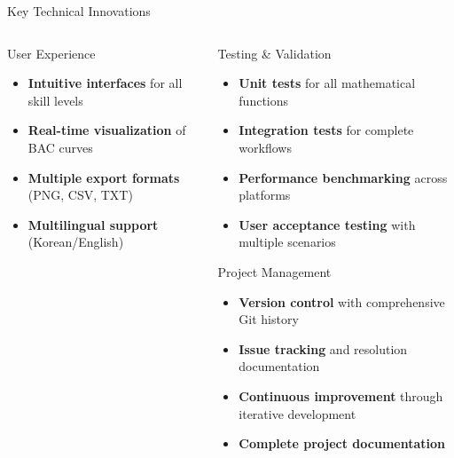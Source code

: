 \documentclass[aspectratio=169]{beamer}
\newcommand{\highlight}[1]{\textcolor{kentech_orange}{\textbf{#1}}}
\begin{document}
\begin{frame}{Key Technical Innovations}
\begin{columns}
\begin{column}{0.5\textwidth}
            \begin{block}{User Experience}
                \begin{itemize}
                    \item \highlight{Intuitive interfaces} for all skill levels
                    \item \highlight{Real-time visualization} of BAC curves
                    \item \highlight{Multiple export formats} (PNG, CSV, TXT)
                    \item \highlight{Multilingual support} (Korean/English)
                \end{itemize}
            \end{block}
        \end{column}
        
        \begin{column}{0.5\textwidth}
            \begin{block}{Testing \& Validation}
                \begin{itemize}
                    \item \highlight{Unit tests} for all mathematical functions
                    \item \highlight{Integration tests} for complete workflows
                    \item \highlight{Performance benchmarking} across platforms
                    \item \highlight{User acceptance testing} with multiple scenarios
                \end{itemize}
            \end{block}
            
            \begin{block}{Project Management}
                \begin{itemize}
                    \item \highlight{Version control} with comprehensive Git history
                    \item \highlight{Issue tracking} and resolution documentation
                    \item \highlight{Continuous improvement} through iterative development
                    \item \highlight{Complete project documentation}
                \end{itemize}
            \end{block}
        \end{column}
    \end{columns}
\end{frame}
\end{document}
